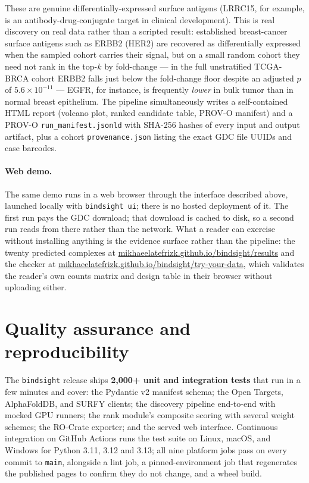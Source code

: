 \documentclass[11pt,letterpaper]{article}
\begin{document}
These are genuine differentially-expressed surface antigens (LRRC15, for
example, is an antibody-drug-conjugate target in clinical development). This
is real discovery on real data rather than a scripted result: established
breast-cancer surface antigens such as ERBB2 (HER2) are recovered as
differentially expressed when the sampled cohort carries their signal, but on
a small random cohort they need not rank in the top-$k$ by fold-change --- in
the full unstratified TCGA-BRCA cohort ERBB2 falls just below the fold-change
floor despite an adjusted $p$ of $5.6\times10^{-11}$ ---
EGFR, for instance, is frequently \emph{lower} in bulk tumor than in normal
breast epithelium. The pipeline simultaneously writes a self-contained HTML
report (volcano plot, ranked candidate table, PROV-O manifest) and a PROV-O
\texttt{run\_manifest.jsonld} with SHA-256 hashes of every input and output
artifact, plus a cohort \texttt{provenance.json} listing the exact GDC file
UUIDs and case barcodes.

\paragraph{Web demo.} The same demo runs in a web browser through the interface
described above, launched locally with \texttt{bindsight ui}; there is no
hosted deployment of it. The first run pays the GDC download; that download is
cached to disk, so a second run reads from there rather than the network. What
a reader can exercise without installing anything is the evidence surface
rather than the pipeline: the twenty predicted complexes at
\href{https://mikhaeelatefrizk.github.io/bindsight/results/}{mikhaeelatefrizk.github.io/bindsight/results} and the
checker at \href{https://mikhaeelatefrizk.github.io/bindsight/try-your-data/}{mikhaeelatefrizk.github.io/bindsight/try-your-data},
which validates the reader's own counts matrix and design table in their
browser without uploading either.

\section{Quality assurance and reproducibility}

The \texttt{bindsight} release ships \textbf{2,000+ unit and
integration tests} that run in a few minutes and cover: the Pydantic
v2 manifest schema; the Open Targets, AlphaFoldDB, and SURFY clients; the
discovery pipeline end-to-end with mocked GPU runners; the rank module's
composite scoring with several weight schemes; the RO-Crate exporter; and
the served web interface. Continuous integration on GitHub Actions runs the
test suite on Linux, macOS, and Windows for Python 3.11, 3.12 and 3.13; all
nine platform jobs pass on every commit to \texttt{main}, alongside a lint job,
a pinned-environment job that regenerates the published pages to confirm they
do not change, and a wheel build.
\end{document}

